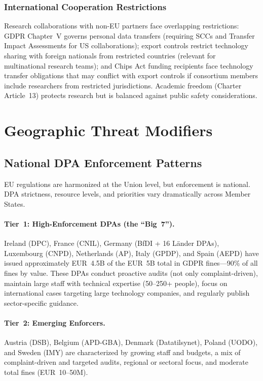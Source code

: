 \documentclass[11pt,a4paper]{article}
\begin{document}
\subsubsection{International Cooperation Restrictions}

Research collaborations with non-EU partners face overlapping restrictions: GDPR Chapter~V governs personal data transfers (requiring SCCs and Transfer Impact Assessments for US collaborations); export controls restrict technology sharing with foreign nationals from restricted countries (relevant for multinational research teams); and Chips Act funding recipients face technology transfer obligations that may conflict with export controls if consortium members include researchers from restricted jurisdictions. Academic freedom (Charter Article~13) protects research but is balanced against public safety considerations.


\section{Geographic Threat Modifiers}
\label{sec:geographic}

\subsection{National DPA Enforcement Patterns}

EU regulations are harmonized at the Union level, but enforcement is national. DPA strictness, resource levels, and priorities vary dramatically across Member States.

\paragraph{Tier~1: High-Enforcement DPAs (the ``Big~7'').}
Ireland (DPC), France (CNIL), Germany (BfDI + 16 L\"ander DPAs), Luxembourg (CNPD), Netherlands (AP), Italy (GPDP), and Spain (AEPD) have issued approximately EUR~4.5B of the EUR~5B total in GDPR fines---90\% of all fines by value. These DPAs conduct proactive audits (not only complaint-driven), maintain large staff with technical expertise (50--250+ people), focus on international cases targeting large technology companies, and regularly publish sector-specific guidance.

\paragraph{Tier~2: Emerging Enforcers.}
Austria (DSB), Belgium (APD-GBA), Denmark (Datatilsynet), Poland (UODO), and Sweden (IMY) are characterized by growing staff and budgets, a mix of complaint-driven and targeted audits, regional or sectoral focus, and moderate total fines (EUR~10--50M).
\end{document}
